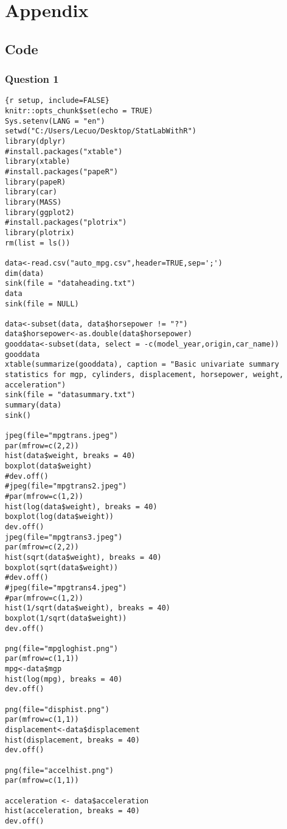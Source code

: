 \section{Appendix}

\subsection{Code}

\subsubsection{Question 1}

\begin{lstlisting}
{r setup, include=FALSE}
knitr::opts_chunk$set(echo = TRUE)
Sys.setenv(LANG = "en")
setwd("C:/Users/Lecuo/Desktop/StatLabWithR")
library(dplyr)
#install.packages("xtable")
library(xtable)
#install.packages("papeR")
library(papeR)
library(car)
library(MASS)
library(ggplot2)
#install.packages("plotrix")
library(plotrix)
rm(list = ls())

data<-read.csv("auto_mpg.csv",header=TRUE,sep=';')
dim(data)
sink(file = "dataheading.txt")
data
sink(file = NULL)

data<-subset(data, data$horsepower != "?")
data$horsepower<-as.double(data$horsepower)
gooddata<-subset(data, select = -c(model_year,origin,car_name))
gooddata
xtable(summarize(gooddata), caption = "Basic univariate summary statistics for mgp, cylinders, displacement, horsepower, weight, acceleration")
sink(file = "datasummary.txt")
summary(data)
sink()

jpeg(file="mpgtrans.jpeg")
par(mfrow=c(2,2))
hist(data$weight, breaks = 40)
boxplot(data$weight)
#dev.off()
#jpeg(file="mpgtrans2.jpeg")
#par(mfrow=c(1,2))
hist(log(data$weight), breaks = 40)
boxplot(log(data$weight))
dev.off()
jpeg(file="mpgtrans3.jpeg")
par(mfrow=c(2,2))
hist(sqrt(data$weight), breaks = 40)
boxplot(sqrt(data$weight))
#dev.off()
#jpeg(file="mpgtrans4.jpeg")
#par(mfrow=c(1,2))
hist(1/sqrt(data$weight), breaks = 40)
boxplot(1/sqrt(data$weight))
dev.off()

png(file="mpgloghist.png")
par(mfrow=c(1,1))
mpg<-data$mgp
hist(log(mpg), breaks = 40)
dev.off()

png(file="disphist.png")
par(mfrow=c(1,1))
displacement<-data$displacement
hist(displacement, breaks = 40)
dev.off()

png(file="accelhist.png")
par(mfrow=c(1,1))

acceleration <- data$acceleration
hist(acceleration, breaks = 40)
dev.off()


\end{lstlisting}
